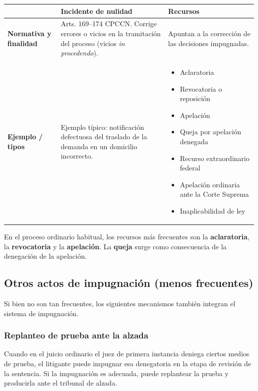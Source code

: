 \documentclass[12pt,oneside]{book}
\begin{document}
\begin{table}[H]
\centering
\small
\begin{tabularx}{\textwidth}{L{0.18\textwidth} >{\raggedright\arraybackslash}X >{\raggedright\arraybackslash}X}
\toprule
 & \textbf{Incidente de nulidad} & \textbf{Recursos} \\
\midrule
\textbf{Normativa y finalidad} &
Arts. 169--174 CPCCN. Corrige errores o vicios en la tramitación del proceso (vicios \textit{in procedendo}). &
Apuntan a la corrección de las decisiones impugnadas. \\
\midrule
\textbf{Ejemplo / tipos} &
Ejemplo típico: notificación defectuosa del traslado de la demanda en un domicilio incorrecto. &
\begin{itemize}[leftmargin=*,nosep]
\item Aclaratoria
\item Revocatoria o reposición
\item Apelación
\item Queja por apelación denegada
\item Recurso extraordinario federal
\item Apelación ordinaria ante la Corte Suprema
\item Inaplicabilidad de ley
\end{itemize} \\
\bottomrule
\end{tabularx}
\end{table}

En el proceso ordinario habitual, los recursos más frecuentes son la \textbf{aclaratoria}, la \textbf{revocatoria} y la \textbf{apelación}. La \textbf{queja} surge como consecuencia de la denegación de la apelación.

\subsection{Otros actos de impugnación (menos frecuentes)}

Si bien no son tan frecuentes, los siguientes mecanismos también integran el sistema de impugnación.

\subsubsection{Replanteo de prueba ante la alzada}

Cuando en el juicio ordinario el juez de primera instancia deniega ciertos medios de prueba, el litigante puede impugnar esa denegatoria en la etapa de revisión de la sentencia. Si la impugnación es adecuada, puede replantear la prueba y producirla ante el tribunal de alzada.
\end{document}
